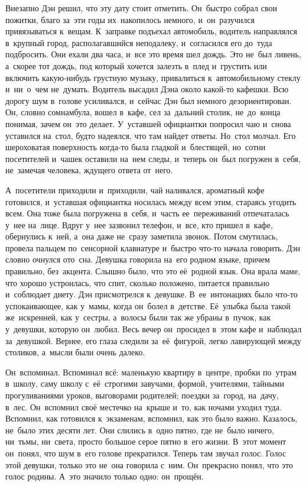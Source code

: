 Внезапно Дэн решил, что эту дату стоит отметить.
Он~быстро собрал свои пожитки, благо за~эти годы их~накопилось немного, и~он~разучился привязываться к~вещам.
К~заправке подъехал автомобиль, водитель направлялся в~крупный город, располагавшийся неподалеку, и~согласился его до~туда подбросить.
Они ехали два часа, и~все это время шел дождь.
Это не~был ливень, а~скорее тот дождь, под который хочется залезть в~плед и~грустить или включить какую-нибудь грустную музыку, привалиться к~автомобильному стеклу и~ни~о~чем не~думать.
Водитель высадил Дэна около какой-то кафешки.
Всю дорогу шум в~голове усиливался, и~сейчас Дэн был немного дезориентирован.
Он, словно сомнамбула, вошел в~кафе, сел за~дальний столик, не~до~конца понимая, зачем он~это делает.
У~уставшей официантки попросил чаю и~снова уставился на~стол, будто надеялся, что там найдет ответы.
Но~стол молчал.
Его шероховатая поверхность когда-то была гладкой и~блестящей, но~сотни посетителей и~чашек оставили на~нем следы, и~теперь он~был погружен в~себя, не~замечая человека, ждущего ответа от~него.

А~посетители приходили и~приходили, чай наливался, ароматный кофе готовился, и~уставшая официантка носилась между всем этим, стараясь угодить всем.
Она тоже была погружена в~себя, и~часть ее~переживаний отпечаталась у~нее на~лице.
Вдруг у~нее зазвонил телефон, и~все, кто пришел в~кафе, обернулись к~ней, а~она даже не~сразу заметила звонок.
Потом смутилась, провела пальцем по~сенсорной клавиатуре и~быстро что-то начала говорить.
Дэн словно очнулся ото~сна.
Девушка говорила на~его родном языке, причем правильно, без~акцента.
Слышно было, что это её~родной язык.
Она врала маме, что хорошо устроилась, что спит, сколько положено, питается правильно и~соблюдает диету.
Дэн присмотрелся к~девушке.
В~ее~интонациях было что-то успокаивающее, как у~мамы, когда он~болел в~детстве.
Её~улыбка была такой же~искренней, как у~сестры, а~волосы были так же убраны в~пучок, как у~девушки, которую он~любил.
Весь вечер он~просидел в~этом кафе и~наблюдал за~девушкой.
Вернее, его глаза следили за~её~фигурой, легко лавирующей между столиков, а~мысли были очень далеко.

Он~вспоминал.
Вспоминал всё: маленькую квартиру в~центре, пробки по~утрам в~школу, саму школу с~её~строгими завучами, формой, учителями, тайными прогуливаниями уроков, выговорами родителей; поездки за~город, на~дачу, в~лес.
Он~вспомнил своё местечко на~крыше и~то, как ночами уходил туда.
Вспомнил, как готовился к~экзаменам, вспомнил, как это было важно.
Казалось, не~было этих десяти лет.
Они слились в~одно пятно, где не~было ничего, ни~тьмы, ни~света, просто большое серое пятно в~его жизни.
В~этот момент он~понял, что шум в~его голове прекратился.
Теперь там звучал голос.
Голос этой девушки, только это не~она говорила с~ним.
Он~прекрасно понял, что это голос родины.
А~это значило только одно: он~прощён.

